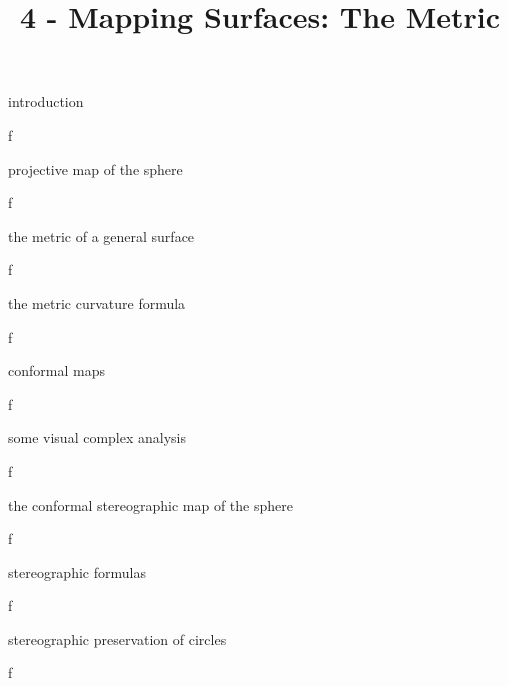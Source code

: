 \documentclass{article}
\title{4 - Mapping Surfaces: The Metric}
\newenvironment{andrew_section}[1]
    {
    \section{#1}
    \begin{itemize}
    }
    {
    \end{itemize}
    }
\begin{document}
\maketitle

\begin{andrew_section}{introduction}
    \item f
\end{andrew_section}

\begin{andrew_section}{projective map of the sphere}
    \item f
\end{andrew_section}

\begin{andrew_section}{the metric of a general surface}
    \item f
\end{andrew_section}

\begin{andrew_section}{the metric curvature formula}
    \item f
\end{andrew_section}

\begin{andrew_section}{conformal maps}
    \item f
\end{andrew_section}

\begin{andrew_section}{some visual complex analysis}
    \item f
\end{andrew_section}

\begin{andrew_section}{the conformal stereographic map of the sphere}
    \item f
\end{andrew_section}

\begin{andrew_section}{stereographic formulas}
    \item f
\end{andrew_section}

\begin{andrew_section}{stereographic preservation of circles}
    \item f
\end{andrew_section}
\end{document}

